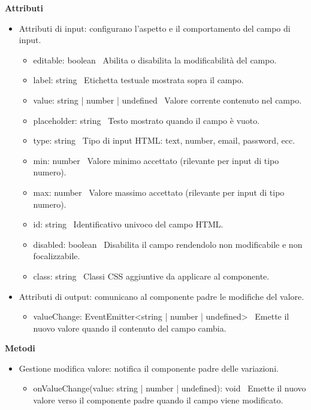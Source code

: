 \documentclass[a4paper,11pt]{article}
\begin{document}
\textbf{Attributi}
\begin{itemize}[noitemsep, topsep=0pt]
  \item Attributi di input: configurano l'aspetto e il comportamento del campo di input.
  \begin{itemize}[noitemsep, topsep=0pt]
    \item editable: boolean \
    Abilita o disabilita la modificabilità del campo.

    \item label: string \
    Etichetta testuale mostrata sopra il campo.

    \item value: string | number | undefined \
    Valore corrente contenuto nel campo.

    \item placeholder: string \
    Testo mostrato quando il campo è vuoto.

    \item type: string \
    Tipo di input HTML: text, number, email, password, ecc.

    \item min: number \
    Valore minimo accettato (rilevante per input di tipo numero).

    \item max: number \
    Valore massimo accettato (rilevante per input di tipo numero).

    \item id: string \
    Identificativo univoco del campo HTML.

    \item disabled: boolean \
    Disabilita il campo rendendolo non modificabile e non focalizzabile.

    \item class: string \
    Classi CSS aggiuntive da applicare al componente.
  \end{itemize}

  \item Attributi di output: comunicano al componente padre le modifiche del valore.
  \begin{itemize}[noitemsep, topsep=0pt]
    \item valueChange: EventEmitter<string | number | undefined> \
    Emette il nuovo valore quando il contenuto del campo cambia.
  \end{itemize}
\end{itemize}

\textbf{Metodi}
\begin{itemize}[noitemsep, topsep=0pt]
  \item Gestione modifica valore: notifica il componente padre delle variazioni.
  \begin{itemize}[noitemsep, topsep=0pt]
    \item onValueChange(value: string | number | undefined): void \
    Emette il nuovo valore verso il componente padre quando il campo viene modificato.
  \end{itemize}
\end{itemize}
\end{document}
